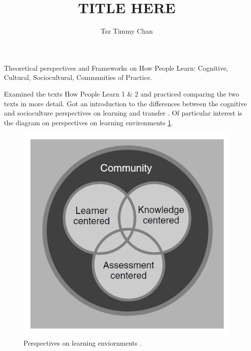 \documentclass{TC}
\title{TITLE HERE}	%
\author{Tsz Timmy Chan}	%
\begin{document}
Theoretical perspectives and Frameworks on How People Learn: Cognitive, Cultural, Sociocultural, Communities of Practice.

Examined the texts How People Learn 1 \& 2 and practiced comparing the two texts in more detail. Got an introduction to the differences between the cognitive and socioculture perspectives on learning and transfer \parencite{sawyer_learning_2014, satyam_cognitive_2018, national_academies_of_sciences_engineering_and_medicine_context_2018, national_academies_of_sciences_engineering_and_medicine_introduction_2018, national_research_council_design_1999,
national_research_council_learning:_1999}. Of particular interest is the diagram on perspectives on learning environments \ref{fig:NRC_perspectives_on_learning_enviornment}.

\begin{figure}[h]
\centering
\includegraphics[width=.5\textwidth]{NRC_perspectives_on_learning_enviornment}

\caption{Perspectives on learning enviornments \parencite{national_research_council_design_1999}.}
\label{fig:NRC_perspectives_on_learning_enviornment}
\end{figure}
\end{document}
